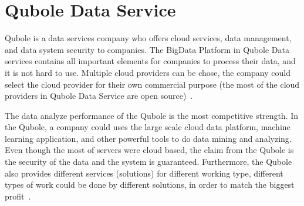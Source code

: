 \section{Qubole Data Service}

Qubole is a data services company who offers cloud services, data management, and data system security to companies. The BigData Platform in Qubole Data services contains all important elements for companies to process their data, and it is not hard to use. Multiple cloud providers can be chose, the company could select the cloud provider for their own commercial purpose (the most of the cloud providers in Qubole Data Service are open source)~\cite{QDS}.

The data analyze performance of the Qubole is the most competitive strength. In the Qubole, a company could uses the large scale cloud data platform, machine learning application, and other powerful tools to do data mining and analyzing. Even though the most of servers were cloud based, the claim from the Qubole is the security of the data and the system is guaranteed. Furthermore, the Qubole also provides different services (solutions) for different working type, different types of work could be done by different solutions, in order to match the biggest profit~\cite{QDS}. 
